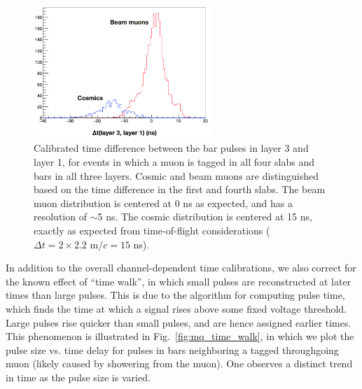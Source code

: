 {\begin{figure}[t]
  \begin{center}
    \includegraphics[width=0.60\textwidth]{figs/milliq/time_calib.png}
    \caption{Calibrated time difference between the bar pulses in layer 3 and layer 1,
      for events in which a muon is tagged in all four slabs and bars in all
      three layers. Cosmic and beam muons are distinguished based on the time difference
      in the first and fourth slabs. The beam muon distribution is centered at 0 ns as expected,
      and has a resolution of $\sim$5 ns. The cosmic distribution is centered at 15 ns,
      exactly as expected from time-of-flight considerations ($\Delta t=2\times 2.2\text{ m}/c = 15$ ns).
            }
    \label{fig:mq_time_calib}
  \end{center}
\end{figure}

In addition to the overall channel-dependent time calibrations, we also correct for the known effect
of ``time walk'', in which small pulses are reconstructed at later times than large pulses. This is
due to the algorithm for computing pulse time, which finds the time at which a signal rises above
some fixed voltage threshold. Large pulses rise quicker than small pulses, and are hence assigned earlier
times. This phenomenon is illustrated in Fig.~\ref{fig:mq_time_walk}, in which we plot the pulse
size vs. time delay for pulses in bars neighboring a tagged throughgoing muon (likely caused by
showering from the muon). One observes a distinct trend in time as the pulse size is varied.

}
